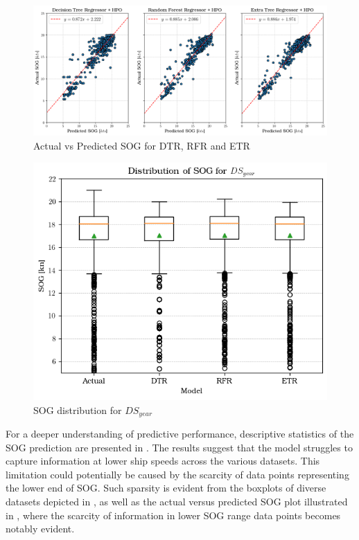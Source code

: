 
\begin{figure}[h!]
    \centering
        \includegraphics[width=.9\textwidth]{02_figures/pred_vs_act_all_tree.png}
        \caption{Actual vs Predicted SOG for DTR, RFR and ETR}
        \label{fig:pred_vs_act_SOG}
\end{figure}

\begin{figure}
    \centering
        \includegraphics[width=.75\textwidth]{02_figures/sog_pred_year.png}
        \caption{SOG distribution for $DS_{year}$}
        \label{fig:boxplot_sogPred_yr}
\end{figure}

For a deeper understanding of predictive performance, descriptive statistics of the SOG prediction are presented in . The results suggest that the model struggles to capture information at lower ship speeds across the various datasets. This limitation could potentially be caused by the scarcity of data points representing the lower end of SOG. Such sparsity is evident from the boxplots of diverse datasets depicted in , as well as the actual versus predicted SOG plot illustrated in , where the scarcity of information in lower SOG range data points becomes notably evident.\\

